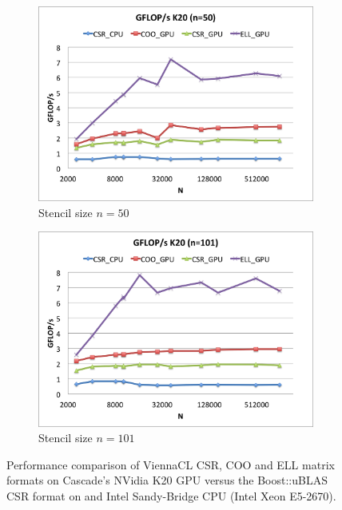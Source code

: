 \documentclass{report}
\begin{document}
\begin{figure}
\begin{subfigure}[t]{0.48\textwidth}
\includegraphics[width=\textwidth]{gpu_content/cascade_spmv/gflops_cascade_k20_n50.png}
\caption{Stencil size $n=50$}
\label{fig:gflops_cascade_k20_n50}
\end{subfigure}
\quad
\begin{subfigure}[t]{0.48\textwidth}
\centering
\includegraphics[width=\textwidth]{gpu_content/cascade_spmv/gflops_cascade_k20_n101.png}
\caption{Stencil size $n=101$}
\label{fig:gflops_cascade_k20_n101}
\end{subfigure}
\caption{Performance comparison of ViennaCL CSR, COO and ELL matrix formats on Cascade's NVidia K20 GPU versus the Boost::uBLAS CSR format on and Intel Sandy-Bridge CPU (Intel Xeon E5-2670).}
\end{figure}
\end{document}
